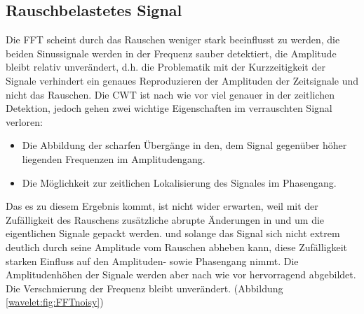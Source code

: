\subsection{Rauschbelastetes Signal
	\label{wavelets:subsection:CWTvsFFTRauschbelastet}}
Die FFT scheint durch das Rauschen weniger stark beeinflusst zu werden, die beiden Sinussignale werden in der Frequenz sauber detektiert, die Amplitude bleibt relativ unverändert, d.h. die Problematik mit der Kurzzeitigkeit der Signale verhindert ein genaues Reproduzieren der Amplituden der Zeitsignale und nicht das Rauschen.
Die CWT ist nach wie vor viel genauer in der zeitlichen Detektion, jedoch gehen zwei wichtige Eigenschaften im verrauschten Signal verloren:
\begin{itemize}
	\item Die Abbildung der scharfen Übergänge in den, dem Signal gegenüber höher liegenden Frequenzen im Amplitudengang.
	\item Die Möglichkeit zur zeitlichen Lokalisierung des Signales im Phasengang.
\end{itemize}
Das es zu diesem Ergebnis kommt, ist nicht wider erwarten, weil mit der Zufälligkeit des Rauschens zusätzliche abrupte Änderungen in und um die eigentlichen Signale gepackt werden. und solange das Signal sich nicht extrem deutlich durch seine Amplitude vom Rauschen abheben kann, diese Zufälligkeit starken Einfluss auf den Amplituden- sowie Phasengang nimmt.
Die Amplitudenhöhen der Signale werden aber nach wie vor hervorragend abgebildet. Die Verschmierung der Frequenz bleibt unverändert.
(Abbildung \ref{wavelet:fig:FFTnoisy})
	
